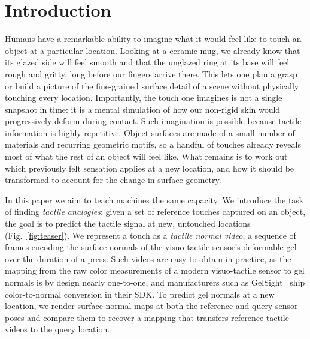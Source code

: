 \section{Introduction}
\label{sec:intro}



Humans have a remarkable ability to imagine what it would feel like to touch an object at a
particular location. Looking at a ceramic mug, we already know that its glazed side will feel
smooth and that the unglazed ring at its base will feel rough and gritty, long before our fingers
arrive there. This lets one plan a grasp or build a picture of the fine-grained surface detail of a
scene without physically touching every location. Importantly, the touch one imagines is not a
single snapshot in time: it is a mental simulation of how our non-rigid skin would progressively
deform during contact. Such imagination is possible because tactile information is highly
repetitive. Object surfaces are made of a small number of materials and recurring geometric motifs,
so a handful of touches already reveals most of what the rest of an object will feel like. What
remains is to work out which previously felt sensation applies at a new location, and how it should
be transformed to account for the change in surface geometry.

In this paper we aim to teach machines the same capacity. We introduce the task of finding
\emph{tactile analogies}: given a set of reference touches captured on an object, the goal is to
predict the tactile signal at new, untouched locations (Fig.~\ref{fig:teaser}). We represent a
touch as a \emph{tactile normal video}, a sequence of frames encoding the surface normals of the
visuo-tactile sensor's deformable gel over the duration of a press. Such videos are easy to obtain
in practice, as the mapping from the raw color measurements of a modern visuo-tactile sensor to gel
normals is by design nearly one-to-one, and manufacturers such as GelSight~\cite{gelsight} ship
color-to-normal conversion in their SDK. To predict gel normals at a new location, we render
surface normal maps at both the reference and query sensor poses and compare them to recover a
mapping that transfers reference tactile videos to the query location.

